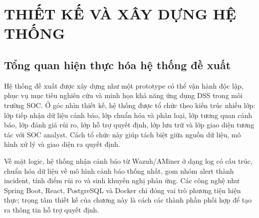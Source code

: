 \documentclass[a4paper,12pt,oneside]{book}
\begin{document}
\chapter{\MakeTextUppercase{Thiết kế và xây dựng hệ thống}}

\section{Tổng quan hiện thực hóa hệ thống đề xuất}
{\fontsize{13pt}{15.6pt}\selectfont

Hệ thống đề xuất được xây dựng như một prototype có thể vận hành độc lập, phục vụ mục tiêu nghiên cứu và minh họa khả năng ứng dụng DSS trong môi trường SOC. Ở góc nhìn thiết kế, hệ thống được tổ chức theo kiến trúc nhiều lớp: lớp tiếp nhận dữ liệu cảnh báo, lớp chuẩn hóa và phân loại, lớp tương quan cảnh báo, lớp đánh giá rủi ro, lớp hỗ trợ quyết định, lớp lưu trữ và lớp giao diện tương tác với SOC analyst. Cách tổ chức này giúp tách biệt giữa nguồn dữ liệu, mô hình xử lý và giao diện ra quyết định.

\noindent Về mặt logic, hệ thống nhận cảnh báo từ Wazuh/AMiner ở dạng log có cấu trúc, chuẩn hóa dữ liệu về mô hình cảnh báo thống nhất, gom nhóm alert thành incident, tính điểm rủi ro và sinh khuyến nghị phản ứng. Các công nghệ như Spring Boot, React, PostgreSQL và Docker chỉ đóng vai trò phương tiện hiện thực; trọng tâm thiết kế của chương này là cách các thành phần phối hợp để tạo ra thông tin hỗ trợ quyết định.

\begin{figure}[H]
\centering
{}
\end{figure}}
\end{document}
